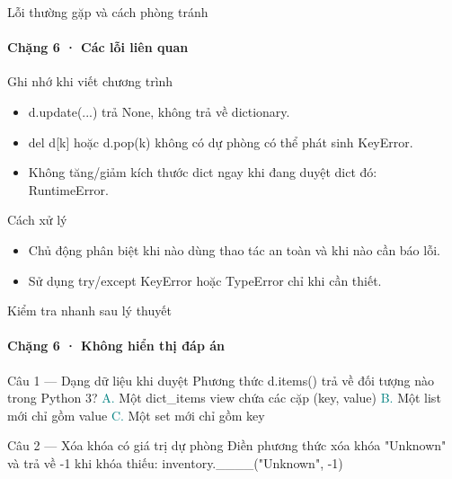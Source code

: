 \documentclass[aspectratio=169,10pt]{beamer}
\begin{document}
\begin{frame}[t]{Lỗi thường gặp và cách phòng tránh}
\framesubtitle{Chặng 6 · Các lỗi liên quan}
\begin{alertblock}{Ghi nhớ khi viết chương trình}
\begin{itemize}
\item d.update(...) trả None, không trả về dictionary.
\item del d[k] hoặc d.pop(k) không có dự phòng có thể phát sinh KeyError.
\item Không tăng/giảm kích thước dict ngay khi đang duyệt dict đó: RuntimeError.
\end{itemize}
\end{alertblock}
\begin{block}{Cách xử lý}
\begin{itemize}
\item Chủ động phân biệt khi nào dùng thao tác an toàn và khi nào cần báo lỗi.
\item Sử dụng try/except KeyError hoặc TypeError chỉ khi cần thiết.
\end{itemize}
\end{block}

\end{frame}

\begin{frame}[t]{Kiểm tra nhanh sau lý thuyết}
\framesubtitle{Chặng 6 · Không hiển thị đáp án}
\small\begin{block}{Câu 1 — Dạng dữ liệu khi duyệt}
Phương thức d.items() trả về đối tượng nào trong Python 3?
\medskip
\quad \textcolor{teal}{A.} Một dict\_items view chứa các cặp (key, value)\hspace{3mm}
\quad \textcolor{teal}{B.} Một list mới chỉ gồm value\hspace{3mm}
\quad \textcolor{teal}{C.} Một set mới chỉ gồm key\hspace{3mm}
\end{block}
\begin{block}{Câu 2 — Xóa khóa có giá trị dự phòng}
Điền phương thức xóa khóa "Unknown" và trả về -1 khi khóa thiếu: inventory.\_\_\_\_("Unknown", -1)
\end{block}
\end{frame}
\end{document}
